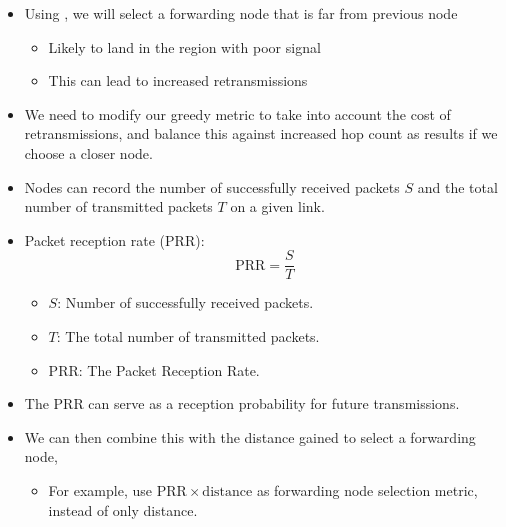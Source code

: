 \begin{itemize}[noitemsep]
\item Using , we will select a forwarding node that is far from previous node
  \begin{itemize}[noitemsep]
  \item Likely to land in the region with poor signal
  \item This can lead to increased retransmissions
  \end{itemize}

\item We need to modify our greedy metric to take into account the cost of retransmissions, and balance this against increased hop count as results if we choose a closer node.
\item Nodes can record the number of successfully received packets $S$ and the total number of transmitted packets $T$ on a given link.
\item Packet reception rate (PRR):
  \begin{equation}\label{eq:Packet_Reception_Rate}
    \mathrm{PRR} = \frac{S}{T}
  \end{equation}
  \begin{itemize}[noitemsep]
  \item $S$: Number of successfully received packets.
  \item $T$: The total number of transmitted packets.
  \item $\mathrm{PRR}$: The Packet Reception Rate.
  \end{itemize}
\item The PRR can serve as a reception probability for future transmissions.
\item We can then combine this with the distance gained to select a
  forwarding node,
  \begin{itemize}[noitemsep]
  \item For example, use $\mathrm{PRR} \times \text{distance}$ as forwarding node selection metric, instead of only distance.
  \end{itemize}
\end{itemize}

